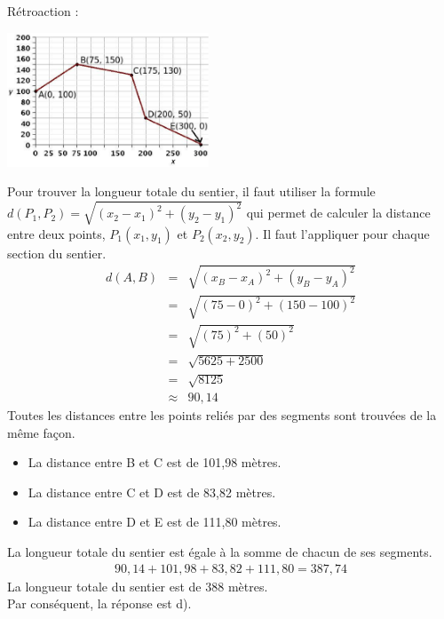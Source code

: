 \documentclass[letterpaper, 12pt]{article}
\begin{document}
R\'etroaction :\\
\begin{center}
 \includegraphics[width=6cm,bb=14 14 531 362]{Q2468.eps}
\end{center}
Pour trouver la longueur totale du sentier, il faut utiliser la formule $d(P_{1}, P_{2})=\sqrt{(x_{2}-x_{1})^{2}+(y_{2}-y_{1})^{2}}$ qui permet de calculer la distance entre deux points, $P_{1}(x_{1}, y_{1})$ et  $P_{2}(x_{2}, y_{2})$. Il faut l'appliquer pour chaque section du sentier.
\begin{eqnarray*}
 d(A, B)&=&\sqrt{(x_{B}-x_{A})^{2}+(y_{B}-y_{A})^{2}}\\
&=&\sqrt{(75-0)^{2}+(150-100)^{2}}\\
&=&\sqrt{(75)^{2}+(50)^{2}}\\
&=&\sqrt{5625+2500}\\
&=&\sqrt{8125}\\
&\approx&90,14
\end{eqnarray*}
Toutes les distances entre les points reli\'es par des segments sont trouv\'ees de la m\^eme fa\c con.
\begin{itemize}
 \item La distance entre B et C est de 101,98 m\`etres.
\item La distance entre C et D est de 83,82 m\`etres.
\item La distance entre D et E est de 111,80 m\`etres.\\
\end{itemize}
La longueur totale du sentier est \'egale \`a la somme de chacun de ses segments.
\begin{eqnarray*}
90,14+101,98+83,82+111,80=387,74
\end{eqnarray*}
La longueur totale du sentier est de 388 m\`etres.\\
Par cons\'equent, la r\'eponse est d).\\
\end{document}
